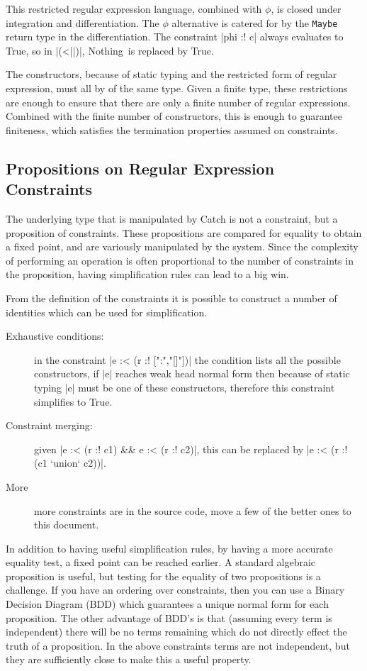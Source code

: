 \documentclass[preprint]{sigplanconf}
\newcommand{\T}[1]{\texttt{#1}}
\newcommand{\C}[1]{\textsf{#1}}
\begin{document}
This restricted regular expression language, combined with $\phi$, is closed under integration and differentiation. The $\phi$ alternative is catered for by the \T{Maybe} return type in the differentiation. The constraint |phi :! c| always evaluates to True, so in |(<||)|, \C{Nothing}\ is replaced by True.

The constructors, because of static typing and the restricted form of regular expression, must all by of the same type.  Given a finite type, these restrictions are enough to ensure that there are only a finite number of regular expressions. Combined with the finite number of constructors, this is enough to guarantee finiteness, which satisfies the termination properties assumed on constraints.

\subsection{Propositions on Regular Expression Constraints}

The underlying type that is manipulated by Catch is not a constraint, but a proposition of constraints. These propositions are compared for equality to obtain a fixed point, and are variously manipulated by the system. Since the complexity of performing an operation is often proportional to the number of constraints in the proposition, having simplification rules can lead to a big win.

From the definition of the constraints it is possible to construct a number of identities which can be used for simplification.

\begin{description}
\item[Exhaustive conditions:] in the constraint |e :< (r :! [":","[]"])| the condition lists all the possible constructors, if |e| reaches weak head normal form then because of static typing |e| must be one of these constructors, therefore this constraint simplifies to True.

\item[Constraint merging:] given |e :< (r :! c1) && e :< (r :! c2)|, this can be replaced by |e :< (r :! (c1 `union` c2))|.

\item[More] more constraints are in the source code, move a few of the better ones to this document.
\end{description}

In addition to having useful simplification rules, by having a more accurate equality test, a fixed point can be reached earlier. A standard algebraic proposition is useful, but testing for the equality of two propositions is a challenge. If you have an ordering over constraints, then you can use a Binary Decision Diagram (BDD) which guarantees a unique normal form for each proposition. The other advantage of BDD's is that (assuming every term is independent) there will be no terms remaining which do not directly effect the truth of a proposition. In the above constraints terms are not independent, but they are sufficiently close to make this a useful property.
\end{document}
